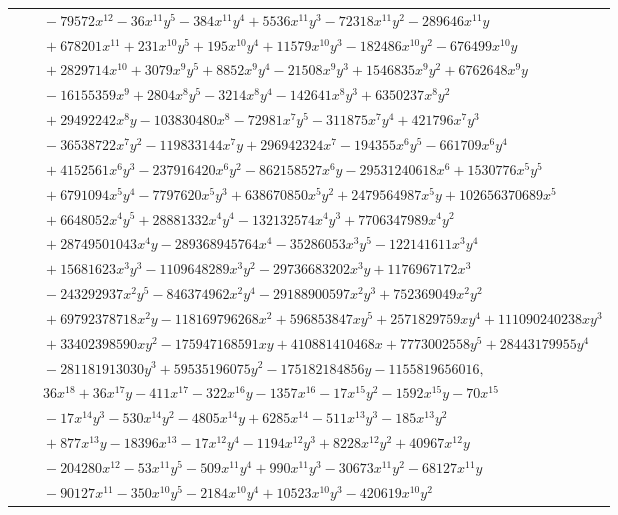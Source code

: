 \documentclass[11pt]{article}
\begin{document}
\begin{longtable}{@{}ll@{}}
 & $\quad -79572x^{12}-36x^{11}y^{5}-384x^{11}y^{4}+5536x^{11}y^{3}-72318x^{11}y^{2}-289646x^{11}y$\\
 & $\quad +678201x^{11}+231x^{10}y^{5}+195x^{10}y^{4}+11579x^{10}y^{3}-182486x^{10}y^{2}-676499x^{10}y$\\
 & $\quad +2829714x^{10}+3079x^{9}y^{5}+8852x^{9}y^{4}-21508x^{9}y^{3}+1546835x^{9}y^{2}+6762648x^{9}y$\\
 & $\quad -16155359x^{9}+2804x^{8}y^{5}-3214x^{8}y^{4}-142641x^{8}y^{3}+6350237x^{8}y^{2}$\\
 & $\quad +29492242x^{8}y-103830480x^{8}-72981x^{7}y^{5}-311875x^{7}y^{4}+421796x^{7}y^{3}$\\
 & $\quad -36538722x^{7}y^{2}-119833144x^{7}y+296942324x^{7}-194355x^{6}y^{5}-661709x^{6}y^{4}$\\
 & $\quad +4152561x^{6}y^{3}-237916420x^{6}y^{2}-862158527x^{6}y-29531240618x^{6}+1530776x^{5}y^{5}$\\
 & $\quad +6791094x^{5}y^{4}-7797620x^{5}y^{3}+638670850x^{5}y^{2}+2479564987x^{5}y+102656370689x^{5}$\\
 & $\quad +6648052x^{4}y^{5}+28881332x^{4}y^{4}-132132574x^{4}y^{3}+7706347989x^{4}y^{2}$\\
 & $\quad +28749501043x^{4}y-289368945764x^{4}-35286053x^{3}y^{5}-122141611x^{3}y^{4}$\\
 & $\quad +15681623x^{3}y^{3}-1109648289x^{3}y^{2}-29736683202x^{3}y+1176967172x^{3}$\\
 & $\quad -243292937x^{2}y^{5}-846374962x^{2}y^{4}-29188900597x^{2}y^{3}+752369049x^{2}y^{2}$\\
 & $\quad +69792378718x^{2}y-118169796268x^{2}+596853847xy^{5}+2571829759xy^{4}+111090240238xy^{3}$\\
 & $\quad +33402398590xy^{2}-175947168591xy+410881410468x+7773002558y^{5}+28443179955y^{4}$\\
 & $\quad -281181913030y^{3}+59535196075y^{2}-175182184856y-1155819656016,$\\
 & $\quad 36x^{18}+36x^{17}y-411x^{17}-322x^{16}y-1357x^{16}-17x^{15}y^{2}-1592x^{15}y-70x^{15}$\\
 & $\quad -17x^{14}y^{3}-530x^{14}y^{2}-4805x^{14}y+6285x^{14}-511x^{13}y^{3}-185x^{13}y^{2}$\\
 & $\quad +877x^{13}y-18396x^{13}-17x^{12}y^{4}-1194x^{12}y^{3}+8228x^{12}y^{2}+40967x^{12}y$\\
 & $\quad -204280x^{12}-53x^{11}y^{5}-509x^{11}y^{4}+990x^{11}y^{3}-30673x^{11}y^{2}-68127x^{11}y$\\
 & $\quad -90127x^{11}-350x^{10}y^{5}-2184x^{10}y^{4}+10523x^{10}y^{3}-420619x^{10}y^{2}$\\

\end{longtable}
\end{document}
